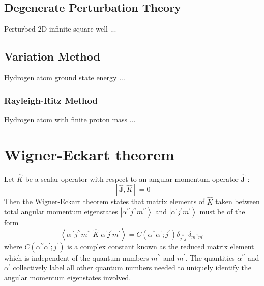\documentclass[12pt,a4paper]{article}
\begin{document}
\subsection{Degenerate Perturbation Theory}
\begin{example}
    {Perturbed 2D infinite square well}
    {...}
\end{example}
\subsection{Variation Method}
\begin{example}
    {Hydrogen atom ground state energy}
    {...}
\end{example}
\subsubsection{Rayleigh-Ritz Method}
\begin{example}
    {Hydrogen atom with finite proton mass}
    {...}
\end{example}
\section{Wigner-Eckart theorem}
Let $\hat{K}$ be a scalar operator with respect to an angular momentum operator $\hat{\boldsymbol{J}}$ :
$$
[\hat{\boldsymbol{J}}, \hat{K}]=0
$$
Then the Wigner-Eckart theorem states that matrix elements of $\hat{K}$ taken between total angular momentum eigenstates $\left|\alpha^{\prime \prime} j^{\prime \prime} m^{\prime \prime}\right\rangle$ and $\left|\alpha^{\prime} j^{\prime} m^{\prime}\right\rangle$ must be of the form
$$
\left\langle\alpha^{\prime \prime} j^{\prime \prime} m^{\prime \prime}|\hat{K}| \alpha^{\prime} j^{\prime} m^{\prime}\right\rangle=C\left(\alpha^{\prime \prime} \alpha^{\prime} ; j^{\prime}\right) \delta_{j^{\prime \prime} j^{\prime}} \delta_{m^{\prime \prime} m^{\prime}}
$$
where $C\left(\alpha^{\prime \prime} \alpha^{\prime} ; j^{\prime}\right)$ is a complex constant known as the reduced matrix element which is independent of the quantum numbers $m^{\prime \prime}$ and $m^{\prime}$. The quantities $\alpha^{\prime \prime}$ and $\alpha^{\prime}$ collectively label all other quantum numbers needed to uniquely identify the angular momentum eigenstates involved.
\end{document}
